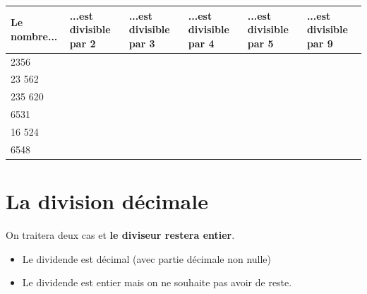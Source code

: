 \documentclass[a4paper]{book}
\begin{document}
    \begin{exemple}
    \end{exemple}
    \begin{center}
        \renewcommand{\arraystretch}{1.5} %
        \begin{tabularx}{\textwidth}{|l|X|X|X|X|X|}
        \hline
        \textbf{Le nombre...} & \textbf{...est divisible par 2} & \textbf{...est divisible par 3}  & \textbf{...est divisible par 4} & \textbf{...est divisible par 5}  & \textbf{...est divisible par 9} \\ \hline
        2356       &                                &                                &                                &                                &                                \\ \hline
        23 562     &                                &                                &                                &                                &                                \\ \hline
        235 620    &                                &                                &                                &                                &                                \\ \hline
        6531       &                                &                                &                                &                                &                                \\ \hline
        16 524     &                                &                                &                                &                                &                                \\ \hline
        6548       &                                &                                &                                &                                &                                \\ \hline
        \end{tabularx}
    \end{center}


\section{La division décimale}
    On traitera deux cas et \textbf{le diviseur restera entier}. 
    \begin{itemize}
        \item Le dividende est décimal (avec partie décimale non nulle)
        \item Le dividende est entier mais on ne souhaite pas avoir de reste.
    \end{itemize}
    
\end{document}
